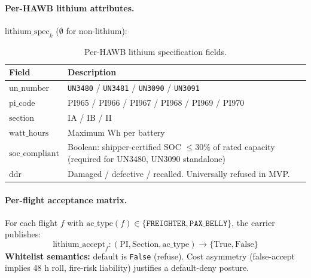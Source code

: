 \documentclass[11pt,a4paper]{article}
\theoremstyle{definition}
\begin{document}
\paragraph{Per-HAWB lithium attributes.}
$\text{lithium\_spec}_k$ ($\emptyset$ for non-lithium):
\begin{table}[H]
\centering
\caption{Per-HAWB lithium specification fields.}
\label{tab:lithium-spec}
\begin{tabular}{lp{9cm}}
\toprule
Field & Description \\
\midrule
$\text{un\_number}$ & \texttt{UN3480} / \texttt{UN3481} / \texttt{UN3090} / \texttt{UN3091} \\
$\text{pi\_code}$ & PI965 / PI966 / PI967 / PI968 / PI969 / PI970 \\
$\text{section}$ & IA / IB / II \\
$\text{watt\_hours}$ & Maximum Wh per battery \\
$\text{soc\_compliant}$ & Boolean: shipper-certified SOC $\leq 30\%$ of rated capacity (required for UN3480, UN3090 standalone) \\
$\text{ddr}$ & Damaged / defective / recalled. Universally refused in MVP. \\
\bottomrule
\end{tabular}
\end{table}

\paragraph{Per-flight acceptance matrix.}
For each flight $f$ with $\text{ac\_type}(f) \in \{\texttt{FREIGHTER},
\texttt{PAX\_BELLY}\}$, the carrier publishes:
\begin{equation}
  \text{lithium\_accept}_f : (\text{PI}, \text{Section}, \text{ac\_type}) \to \{\text{True}, \text{False}\}
  \label{eq:lithium-accept}
\end{equation}
\textbf{Whitelist semantics:} default is \texttt{False} (refuse). Cost
asymmetry (false-accept implies 48 h roll, fire-risk liability) justifies a
default-deny posture.
\end{document}
